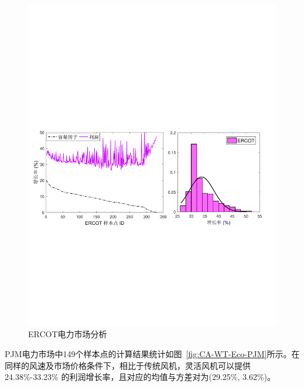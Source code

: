 \begin{figure}[H] %
  \centering
  \includegraphics[scale=0.70]{figures/Chap5-19-CA-WT-Eco-ERCOT.pdf}
  \caption{ERCOT电力市场分析}
  \label{fig:CA-WT-Eco-ERCOT}
\end{figure}

PJM电力市场中149个样本点的计算结果统计如图~\ref{fig:CA-WT-Eco-PJM}所示。在同样的风速及市场价格条件下，相比于传统风机，灵活风机可以提供 24.38\%-33.23\% 的利润增长率，且对应的均值与方差对为(29.25\%, 3.62\%)。

